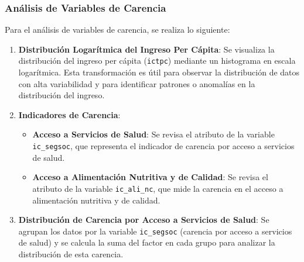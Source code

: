 \documentclass[
  12pt,
]{book}
\newenvironment{Shaded}{\begin{snugshade}}{\end{snugshade}}
\newcommand{\AttributeTok}[1]{\textcolor[rgb]{0.13,0.29,0.53}{#1}}
\newcommand{\CommentTok}[1]{\textcolor[rgb]{0.56,0.35,0.01}{\textit{#1}}}
\newcommand{\FunctionTok}[1]{\textcolor[rgb]{0.13,0.29,0.53}{\textbf{#1}}}
\newcommand{\NormalTok}[1]{#1}
\newcommand{\SpecialCharTok}[1]{\textcolor[rgb]{0.81,0.36,0.00}{\textbf{#1}}}
\providecommand{\tightlist}{%
  \setlength{\itemsep}{0pt}\setlength{\parskip}{0pt}}
\begin{document}
\hypertarget{anuxe1lisis-de-variables-de-carencia}{%
\subsubsection*{Análisis de Variables de Carencia}\label{anuxe1lisis-de-variables-de-carencia}}

Para el análisis de variables de carencia, se realiza lo siguiente:

\begin{enumerate}
\def\labelenumi{\arabic{enumi}.}
\item
  \textbf{Distribución Logarítmica del Ingreso Per Cápita}: Se visualiza la distribución del ingreso per cápita (\texttt{ictpc}) mediante un histograma en escala logarítmica. Esta transformación es útil para observar la distribución de datos con alta variabilidad y para identificar patrones o anomalías en la distribución del ingreso.
\item
  \textbf{Indicadores de Carencia}:

  \begin{itemize}
  \tightlist
  \item
    \textbf{Acceso a Servicios de Salud}: Se revisa el atributo de la variable \texttt{ic\_segsoc}, que representa el indicador de carencia por acceso a servicios de salud.
  \item
    \textbf{Acceso a Alimentación Nutritiva y de Calidad}: Se revisa el atributo de la variable \texttt{ic\_ali\_nc}, que mide la carencia en el acceso a alimentación nutritiva y de calidad.
  \end{itemize}
\item
  \textbf{Distribución de Carencia por Acceso a Servicios de Salud}: Se agrupan los datos por la variable \texttt{ic\_segsoc} (carencia por acceso a servicios de salud) y se calcula la suma del factor en cada grupo para analizar la distribución de esta carencia.
\end{enumerate}

\begin{Shaded}
\end{Shaded}
\end{document}
